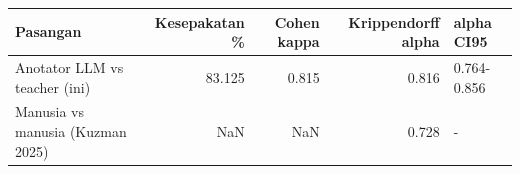 \begin{tabular}{lrrrl}
\toprule
Pasangan & Kesepakatan \% & Cohen kappa & Krippendorff alpha & alpha CI95 \\
\midrule
Anotator LLM vs teacher (ini) & 83.125 & 0.815 & 0.816 & 0.764-0.856 \\
Manusia vs manusia (Kuzman 2025) & NaN & NaN & 0.728 & - \\
\bottomrule
\end{tabular}
